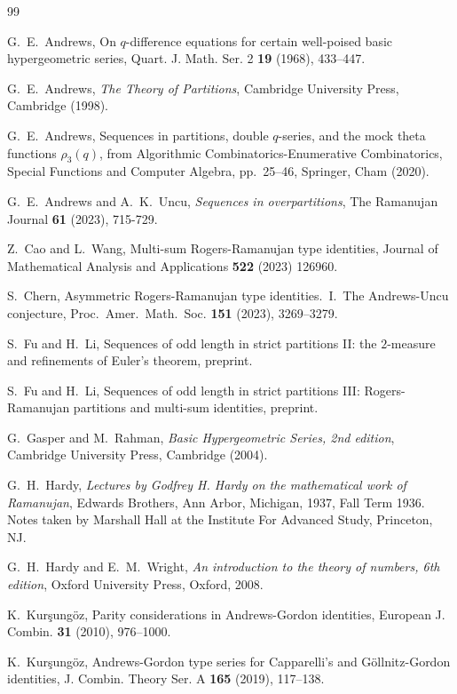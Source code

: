 \documentclass[11pt,reqno]{amsart}
\numberwithin{equation}{section}
\theoremstyle{plain}
\theoremstyle{definition}
\begin{document}
\begin{thebibliography}{99}



 G.~E.~Andrews, On $q$-difference equations for certain well-poised basic hypergeometric series, Quart. J. Math. Ser. 2 {\bf 19} (1968), 433--447.

 G.~E.~Andrews, {\it The Theory of Partitions}, Cambridge University Press, Cambridge (1998).

 G.~E.~Andrews, Sequences in partitions, double $q$-series, and the mock theta functions $\rho_3(q)$, from Algorithmic Combinatorics-Enumerative Combinatorics, Special Functions and Computer Algebra, pp.~25--46, Springer, Cham (2020).

 G.~E.~Andrews and A.~K.~Uncu, {\it Sequences in overpartitions}, The Ramanujan Journal {\bf 61} (2023), 715-729.

 Z.~Cao and L.~Wang, Multi-sum Rogers-Ramanujan type identities, Journal of Mathematical Analysis and Applications {\bf 522} (2023) 126960.

 S.~Chern, Asymmetric Rogers-Ramanujan type identities.~I.~The Andrews-Uncu conjecture, Proc.~Amer.~Math.~Soc. {\bf151} (2023), 3269--3279.

 S.~Fu and H.~Li, Sequences of odd length in strict partitions II: the $2$-measure and refinements of Euler's theorem, preprint.

 S.~Fu and H.~Li, Sequences of odd length in strict partitions III: Rogers-Ramanujan partitions and multi-sum identities, preprint.

 G.~Gasper and M.~Rahman, {\it Basic Hypergeometric Series, 2nd edition}, Cambridge University Press, Cambridge (2004).

 G.~H.~Hardy, {\it Lectures by Godfrey H. Hardy on the mathematical work of Ramanujan}, Edwards Brothers, Ann Arbor, Michigan, 1937, Fall Term 1936. Notes taken by Marshall Hall at the Institute For Advanced Study, Princeton, NJ.

 G.~H.~Hardy and E.~M.~Wright, {\it An introduction to the theory of numbers, 6th edition}, Oxford University Press, Oxford, 2008.

 K.~Kur\c{s}ung\"{o}z, Parity considerations in Andrews-Gordon identities, European J. Combin. {\bf 31} (2010), 976--1000.

 K.~Kur\c{s}ung\"{o}z, Andrews-Gordon type series for Capparelli's and G\"{o}llnitz-Gordon identities, J. Combin. Theory Ser. A {\bf 165} (2019), 117--138.


\end{thebibliography}
\end{document}

